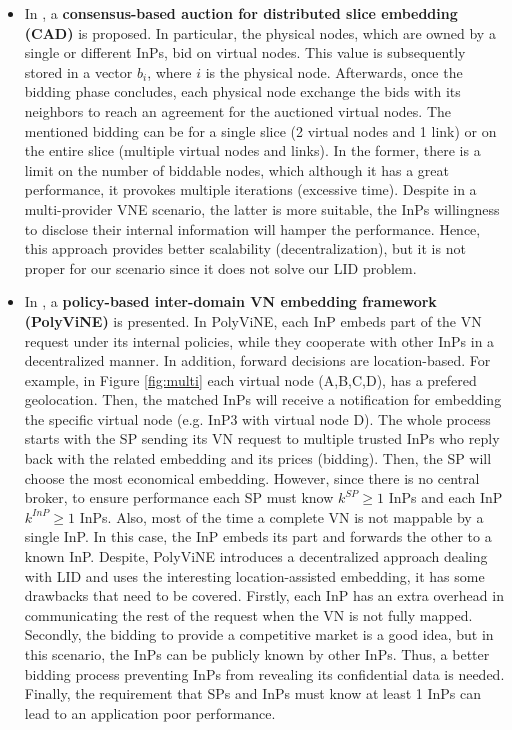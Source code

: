 \begin{itemize}
	\item In \citep{esposito2013general}, a \textbf{consensus-based auction for distributed slice embedding (CAD)} is proposed. In particular, the physical nodes, which are owned by a single or different InPs, bid on virtual nodes. This value is subsequently stored in a vector $b_i$, where $i$ is the physical node. Afterwards, once the bidding phase concludes, each physical node exchange the bids with its neighbors to reach an agreement for the auctioned virtual nodes. The mentioned bidding can be for a single slice (2 virtual nodes and 1 link) or on the entire slice (multiple virtual nodes and links). In the former, there is a limit on the number of biddable nodes, which although it has a great performance, it provokes multiple iterations (excessive time). Despite in a multi-provider VNE scenario, the latter is more suitable, the InPs willingness to disclose their internal information will hamper the performance. Hence, this approach provides better scalability (decentralization), but it is not proper for our scenario since it does not solve our LID problem.
	\item In \citep{chowdhury2010polyvine}, a \textbf{policy-based inter-domain VN embedding framework (PolyViNE)} is presented. In PolyViNE, each InP embeds part of the VN request under its internal policies, while they cooperate with other InPs in a decentralized manner. In addition, forward decisions are location-based. For example, in Figure \ref{fig:multi} each virtual node (A,B,C,D), has a prefered geolocation. Then, the matched InPs will receive a notification for embedding the specific virtual node (e.g. InP3 with virtual node D). The whole process starts with the SP sending its VN request to multiple trusted InPs who reply back with the related embedding and its prices (bidding). Then, the SP will choose the most economical embedding. However, since there is no central broker, to ensure performance each SP must know $k^{SP} \geq 1$ InPs and each InP $k^{InP} \geq 1$ InPs. Also, most of the time a complete VN is not mappable by a single InP. In this case, the InP embeds its part and forwards the other to a known InP. Despite, PolyViNE introduces a decentralized approach dealing with LID and uses the interesting location-assisted embedding, it has some drawbacks that need to be covered. Firstly, each InP has an extra overhead in communicating the rest of the request when the VN is not fully mapped. Secondly, the bidding to provide a competitive market is a good idea, but in this scenario, the InPs can be publicly known by other InPs. Thus, a better bidding process preventing InPs from revealing its confidential data is needed. Finally, the requirement that SPs and InPs must know at least 1 InPs can lead to an application poor performance.
	

\end{itemize}

